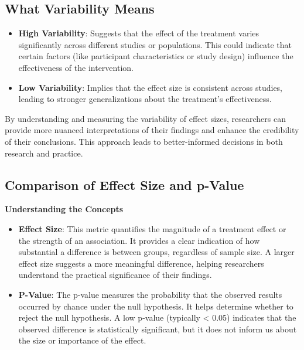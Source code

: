 \documentclass[
]{book}
\begin{document}
\subsection{What Variability Means}\label{what-variability-means}

\begin{itemize}
\item
  \textbf{High Variability}: Suggests that the effect of the treatment varies significantly across different studies or populations.
  This could indicate that certain factors (like participant characteristics or study design) influence the effectiveness of the intervention.
\item
  \textbf{Low Variability}: Implies that the effect size is consistent across studies, leading to stronger generalizations about the treatment's effectiveness.
\end{itemize}

By understanding and measuring the variability of effect sizes, researchers can provide more nuanced interpretations of their findings and enhance the credibility of their conclusions.
This approach leads to better-informed decisions in both research and practice.

\subsection{Comparison of Effect Size and p-Value}\label{comparison-of-effect-size-and-p-value}

\textbf{Understanding the Concepts}

\begin{itemize}
\item
  \textbf{Effect Size}: This metric quantifies the magnitude of a treatment effect or the strength of an association.
  It provides a clear indication of how substantial a difference is between groups, regardless of sample size.
  A larger effect size suggests a more meaningful difference, helping researchers understand the practical significance of their findings.
\item
  \textbf{P-Value}: The p-value measures the probability that the observed results occurred by chance under the null hypothesis.
  It helps determine whether to reject the null hypothesis.
  A low p-value (typically \textless{} 0.05) indicates that the observed difference is statistically significant, but it does not inform us about the size or importance of the effect.
\end{itemize}
\end{document}
